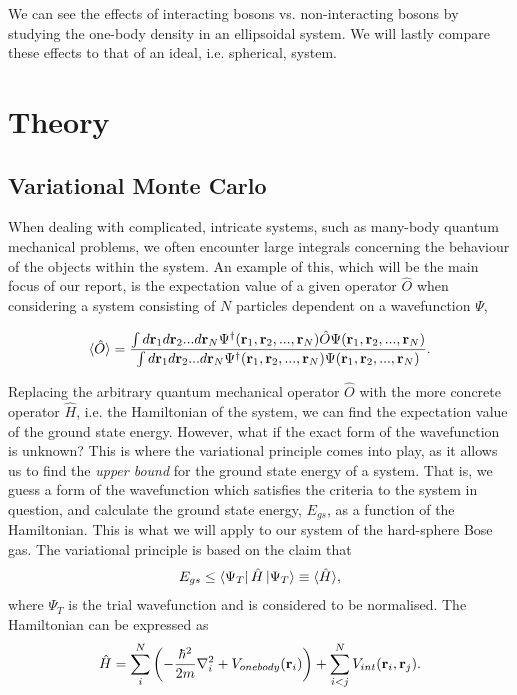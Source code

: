 \documentclass[
    a4paper, aps, twocolumn, floatfix, superscriptaddress,
    nofootinbib]{revtex4-1}
\begin{document}
We can see the effects of interacting bosons vs. non-interacting bosons by studying the one-body density in an ellipsoidal system. We will lastly compare these effects to that of an ideal, i.e. spherical, system.


\section{Theory}\label{sec:Theory}
\subsection{Variational Monte Carlo}
When dealing with complicated, intricate systems, such as many-body quantum mechanical problems, we often encounter large integrals concerning the behaviour of the objects within the system. An example of this, which will be the main focus of our report, is the expectation value of a given operator $\hat{O}$ when considering a system consisting of $N$ particles dependent on a wavefunction $\Psi$,

\begin{equation}\label{eq:1}
    \langle\hat{O}\rangle = \frac{\int d\bold r_1 d\bold r_2 ... d\bold r_N \Psi^\dagger(\bold r_1, \bold r_2, ..., \bold r_N)\hat{O}\Psi(\bold r_1, \bold r_2, ..., \bold r_N)}{\int d\bold r_1 d\bold r_2 ... d\bold r_N \Psi^\dagger(\bold r_1, \bold r_2, ..., \bold r_N)\Psi(\bold r_1, \bold r_2, ..., \bold r_N)}.
\end{equation}

Replacing the arbitrary quantum mechanical operator $\hat{O}$ with the more concrete operator $\hat{H}$, i.e. the Hamiltonian of the system, we can find the expectation value of the ground state energy. However, what if the exact form of the wavefunction is unknown? This is where the variational principle comes into play, as it allows us to find the \textit{upper bound} for the ground state energy of a system. That is, we guess a form of the wavefunction which satisfies the criteria to the system in question, and calculate the ground state energy, $E_{gs}$, as a function of the Hamiltonian. This is what we will apply to our system of the hard-sphere Bose gas. The variational principle is based on the claim that
\begin{align}
E_{gs} \leq \bra{\Psi_T}\hat{H}\ket{\Psi_T} \equiv \langle \hat{H} \rangle \label{eq:E_ground_state_var},
\end{align}
where $\Psi_T$ is the trial wavefunction and is considered to be normalised. The Hamiltonian can be expressed as
\begin{align}
    \hat{H} = \sum_i^N\left(-\frac{\hbar^2}{2m}\nabla_i^2 + V_{onebody}(\bold{r}_i)\right) + \sum_{i<j}^N V_{int}(\bold{r}_i, \bold{r}_j). \label{eq:Hamiltonian}
\end{align}
\end{document}
